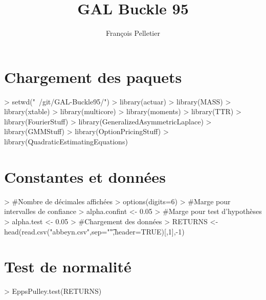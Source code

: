 \documentclass{report}
\begin{document}


\title{GAL Buckle 95}
\author{François Pelletier}
\maketitle
\tableofcontents

\section{Chargement des paquets}
\begin{Schunk}
\begin{Sinput}
> setwd("~/git/GAL-Buckle95/")
> library(actuar)
> library(MASS)
> library(xtable)
> library(multicore)
> library(moments)
> library(TTR)
> library(FourierStuff)
> library(GeneralizedAsymmetricLaplace)
> library(GMMStuff)
> library(OptionPricingStuff)
> library(QuadraticEstimatingEquations)
\end{Sinput}
\end{Schunk}

\section{Constantes et données}

\begin{Schunk}
\begin{Sinput}
> #Nombre de décimales affichées
> options(digits=6)
> #Marge pour intervalles de confiance
> alpha.confint <- 0.05 
> #Marge pour test d'hypothèses
> alpha.test <- 0.05
> #Chargement des données
> RETURNS <- head(read.csv("abbeyn.csv",sep="\t",header=TRUE)[,1],-1)
\end{Sinput}
\end{Schunk}

\section{Test de normalité}

\begin{Schunk}
\begin{Sinput}
> EppsPulley.test(RETURNS)
\end{Sinput}
\end{Schunk}
\end{document}
